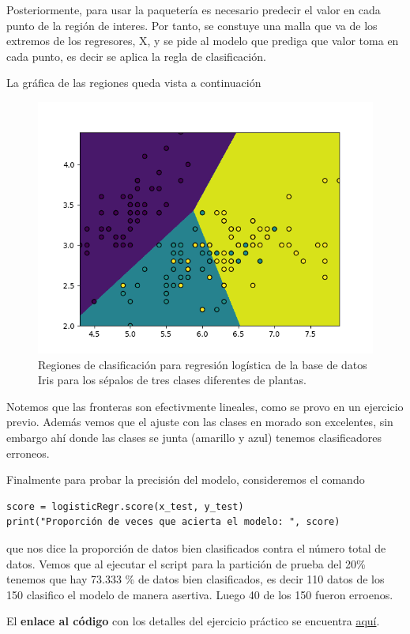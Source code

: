\documentclass[a4paper, 11pt]{article}
\begin{document}
Posteriormente, para usar la paquetería es necesario predecir el valor en cada punto de la región de interes. Por tanto, se constuye una malla que va de los extremos de los regresores, X, y se pide al modelo que prediga que valor toma en cada punto, es decir se aplica la regla de clasificación. 

La gráfica de las regiones queda vista a continuación
\begin{figure}[H]
  \centering
  \includegraphics[width = 15 cm ]{Images/ClasificadorLogistico.png}
  \caption{Regiones de clasificación para regresión logística de la base de datos Iris para los sépalos de tres clases diferentes de plantas. }
\end{figure}

Notemos que las fronteras son efectivmente lineales, como se provo en un ejercicio previo. Además vemos que el ajuste con las clases en morado son excelentes, sin embargo ahí donde las clases se junta (amarillo y azul) tenemos clasificadores erroneos.

Finalmente para probar la precisión del modelo, consideremos el comando
\begin{lstlisting}
score = logisticRegr.score(x_test, y_test)
print("Proporción de veces que acierta el modelo: ", score)
\end{lstlisting}
que nos dice la proporción de datos bien clasificados contra el número total de datos. Vemos que al ejecutar el script para la partición de prueba del 20\% tenemos que hay 73.333 \% de datos bien clasificados, es decir 110 datos de los 150 clasifico el modelo de manera asertiva. Luego 40 de los 150 fueron erroenos.


El \textbf{enlace al código} con los detalles del ejercicio práctico se encuentra \href{https://colab.research.google.com/drive/13hEX_ubDx0vYYG6S1ndCaer41euqlr3x?usp=sharing}{\color{blue} aquí}.
\end{document}
